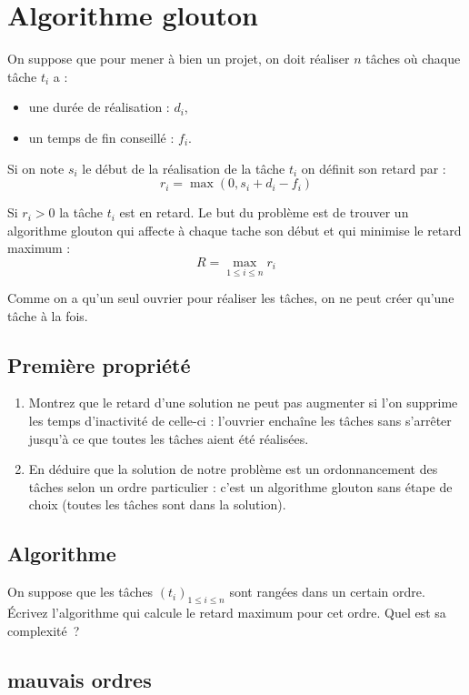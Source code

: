 \documentclass
[12pt]
{article}
\begin{document}
\section{Algorithme glouton}

On suppose que pour mener à bien un projet, on doit réaliser $n$ tâches où chaque tâche $t_i$ a :
\begin{itemize}
  \item une durée de réalisation : $d_i$,
  \item un temps de fin conseillé : $f_i$.
\end{itemize}  

Si on note $s_i$ le début de la réalisation de la tâche $t_i$ on définit son retard par : $$r_i = \max(0, s_i + d_i - f_i)$$

Si $r_i > 0$ la tâche $t_i$ est en retard. Le but du problème est de trouver un algorithme glouton qui affecte à chaque tache son début et qui minimise le retard maximum : $$R = \max_{1\leq i \leq n} r_i$$ 

Comme on a qu'un seul ouvrier pour réaliser les tâches, on ne peut créer qu'une tâche à la fois.


\subsection{Première propriété}

\begin{enumerate}
  \item Montrez que le retard d'une solution ne peut pas augmenter si l'on supprime les temps d'inactivité de celle-ci : l'ouvrier enchaîne les tâches sans s'arrêter jusqu'à ce que toutes les tâches aient été réalisées.
  \item En déduire que la solution de notre problème est un ordonnancement des tâches selon un ordre particulier : c'est un algorithme glouton sans étape de choix (toutes les tâches sont dans la solution).
\end{enumerate}


\subsection{Algorithme}

On suppose que les tâches $(t_i)_{1\leq i \leq n}$ sont rangées dans un certain ordre. Écrivez l'algorithme qui calcule le retard maximum pour cet ordre. Quel est sa complexité~?

\subsection{mauvais ordres}
\end{document}
